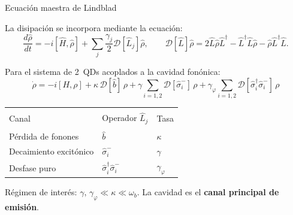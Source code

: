 \documentclass[
11pt,notheorems,hyperref={pdfauthor=whatever}
]{beamer}
\begin{document}
\begin{frame}{Ecuación maestra de Lindblad}
	
	La disipación se incorpora mediante la ecuación:
	\begin{equation*}
		\frac{d\hat{\rho}}{dt} = -i\left[\hat{H},\hat{\rho}\right]
		+ \sum_j \frac{\gamma_j}{2}\mathcal{D}[\hat{L}_j]\hat{\rho},
		\qquad
		\mathcal{D}[\hat{L}]\hat{\rho} = 2\hat{L}\hat{\rho}\hat{L}^\dagger
		- \hat{L}^\dagger\hat{L}\hat{\rho}
		- \hat{\rho}\hat{L}^\dagger\hat{L}.
	\end{equation*}
	
	\vspace{4pt}
	Para el sistema de 2~QDs acoplados a la cavidad fonónica:
	\begin{equation*}
		\dot{\rho} = -i[H,\rho]
		+ \kappa\,\mathcal{D}[\hat{b}]\,\rho
		+ \gamma\sum_{i=1,2}\mathcal{D}[\hat{\sigma}_i^-]\,\rho
		+ \gamma_\varphi\sum_{i=1,2}\mathcal{D}[\hat{\sigma}_i^\dagger\hat{\sigma}_i^-]\,\rho
	\end{equation*}
	
	\vspace{2pt}
	\begin{center}
		\begin{tabular}{lll}
			\hline\\[-8pt]
			Canal & Operador $\hat{L}_j$ & Tasa \\[2pt]
			\hline\\[-6pt]
			Pérdida de fonones      & $\hat{b}$                                    & $\kappa$ \\[4pt]
			Decaimiento excitónico  & $\hat{\sigma}_i^-$                           & $\gamma$ \\[4pt]
			Desfase puro            & $\hat{\sigma}_i^\dagger\hat{\sigma}_i^-$     & $\gamma_\varphi$ \\[4pt]
			\hline
		\end{tabular}
	\end{center}
	
	\vspace{6pt}
	Régimen de interés: $\gamma,\,\gamma_\varphi \ll \kappa \ll \omega_b$.
	La cavidad es el \textbf{canal principal de emisión}.
	
\end{frame}
\end{document}
